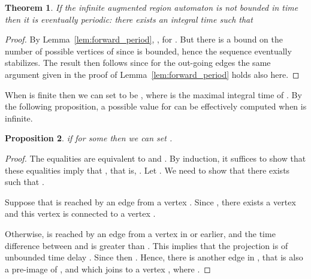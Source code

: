 \documentclass[11pt]{amsart}
\newtheorem{theorem}{Theorem}[section]
\newtheorem{proposition}[theorem]{Proposition}
\theoremstyle{definition}
\begin{document}
\begin{theorem}
\label{th:eventual_period}
If the infinite augmented region automaton  is not bounded in time then it is eventually periodic: there exists an integral time  such that 

\end{theorem}
\begin{proof}
By Lemma~\ref{lem:forward_period}, , for .
But there is a bound on the number of possible vertices of  since  is bounded, hence the sequence  eventually stabilizes.
The result then follows since for the out-going edges the same argument given in the proof of Lemma~\ref{lem:forward_period} holds also here.
\end{proof}
When  is finite then we can set  to be , where  is the maximal integral time of .
By the following proposition, a possible value for  can be effectively computed when  is infinite.
\begin{proposition}
\label{prop:cons_eq}
if  for some  then we can set
.
\end{proposition}
\begin{proof}
The equalities  are equivalent to  and . 
By induction, it suffices to show that these equalities imply that , that is, .
Let .
We need to show that there exists  such that .

Suppose that  is reached by an edge from a vertex .
Since , there exists a vertex  and this vertex is connected to a vertex  .

Otherwise,  is reached by an edge  from a vertex  in  or earlier, and the time difference  between  and  is greater than .
This implies that the projection  is of unbounded time delay .
Since  then .
Hence, there is another edge  in , that is also a pre-image of , and which joins  to a vertex , where .
\end{proof}
\end{document}
